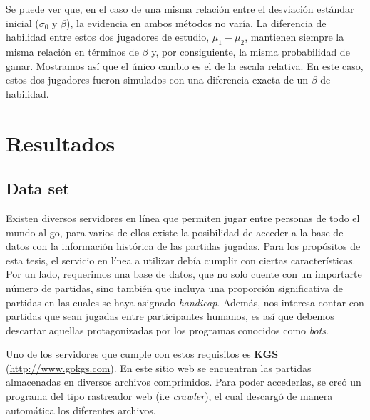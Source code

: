 \documentclass[11pt,twoside,spanish]{report} %
\begin{document}
Se puede ver que, en el caso de una misma relaci\'on entre el desviaci\'on est\'andar inicial ($\sigma_0$ y $\beta$), la evidencia en ambos m\'etodos no var\'ia. 
La diferencia de habilidad entre estos dos jugadores de estudio, $\mu_1-\mu_2$, mantienen siempre la misma relaci\'on en t\'erminos de $\beta$ y, por consiguiente, la misma probabilidad de ganar.
Mostramos as\'i que el \'unico cambio es el de la escala relativa.
En este caso, estos dos jugadores fueron simulados con una diferencia exacta de un $\beta$ de habilidad.










\chapter{Resultados}

\section{Data set}


Existen diversos servidores en l\'inea que permiten jugar entre personas de todo el mundo al go, para varios de ellos existe la posibilidad de acceder a la base de datos con la informaci\'on hist\'orica de las partidas jugadas.
Para los prop\'ositos de esta tesis, el servicio en l\'inea a utilizar deb\'ia cumplir con ciertas caracter\'isticas.
Por un lado, requerimos una base de datos, que no solo cuente con un importarte n\'umero de partidas, sino tambi\'en que incluya una proporci\'on significativa de partidas en las cuales se haya asignado \textit{handicap}.
Adem\'as, nos interesa contar con partidas que sean jugadas entre participantes humanos, es as\'i que debemos descartar aquellas protagonizadas por los programas conocidos como \textit{bots}.

Uno de los servidores que cumple con estos requisitos es \textbf{KGS} (\url{http://www.gokgs.com}).
En este sitio web se encuentran las partidas almacenadas en diversos archivos comprimidos.
Para poder accederlas, se cre\'o un programa del tipo rastreador web (i.e \textit{crawler}), el cual descarg\'o de manera autom\'atica los diferentes archivos.
\end{document}
